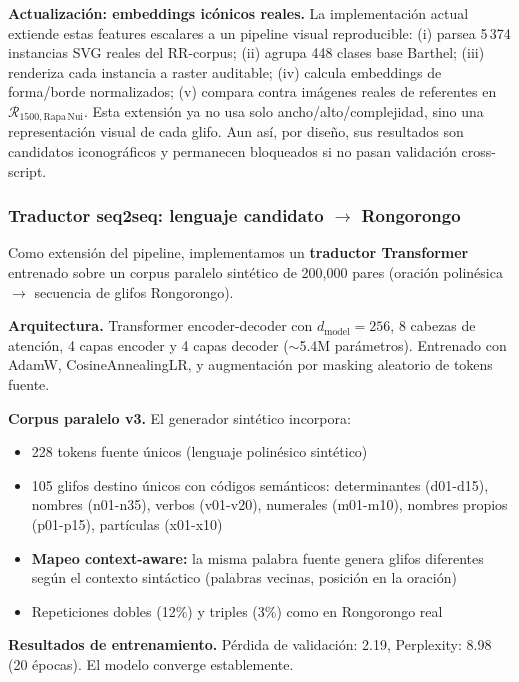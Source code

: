 \documentclass[11pt,a4paper]{article}
\newcommand{\1}{\mathbf{1}}
\numberwithin{equation}{section}
\begin{document}
\textbf{Actualización: embeddings icónicos reales.} La implementación actual extiende estas features escalares a un pipeline visual reproducible: (i) parsea 5\,374 instancias SVG reales del RR-corpus; (ii) agrupa 448 clases base Barthel; (iii) renderiza cada instancia a raster auditable; (iv) calcula embeddings de forma/borde normalizados; (v) compara contra imágenes reales de referentes en $\mathcal{R}_{1500,\mathrm{Rapa\,Nui}}$. Esta extensión ya no usa solo ancho/alto/complejidad, sino una representación visual de cada glifo. Aun así, por diseño, sus resultados son candidatos iconográficos y permanecen bloqueados si no pasan validación cross-script.

\subsubsection{Traductor seq2seq: lenguaje candidato $\rightarrow$ Rongorongo}

Como extensión del pipeline, implementamos un \textbf{traductor Transformer} entrenado sobre un corpus paralelo sintético de 200,000 pares (oración polinésica $\rightarrow$ secuencia de glifos Rongorongo).

\textbf{Arquitectura.} Transformer encoder-decoder con $d_{\text{model}}=256$, 8 cabezas de atención, 4 capas encoder y 4 capas decoder ($\sim$5.4M parámetros). Entrenado con AdamW, CosineAnnealingLR, y augmentación por masking aleatorio de tokens fuente.

\textbf{Corpus paralelo v3.} El generador sintético incorpora:
\begin{itemize}
    \item 228 tokens fuente únicos (lenguaje polinésico sintético)
    \item 105 glifos destino únicos con códigos semánticos: determinantes (d01-d15), nombres (n01-n35), verbos (v01-v20), numerales (m01-m10), nombres propios (p01-p15), partículas (x01-x10)
    \item \textbf{Mapeo context-aware:} la misma palabra fuente genera glifos diferentes según el contexto sintáctico (palabras vecinas, posición en la oración)
    \item Repeticiones dobles (12\%) y triples (3\%) como en Rongorongo real
\end{itemize}

\textbf{Resultados de entrenamiento.} Pérdida de validación: 2.19, Perplexity: 8.98 (20 épocas). El modelo converge establemente.
\end{document}
